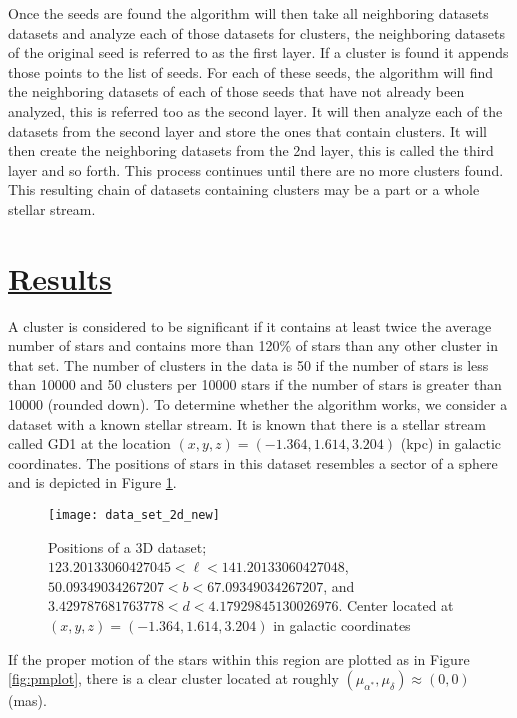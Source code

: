 \documentclass[notitlepage,nofootinbib,preprintnumbers,aps,prd]{revtex4-1}
\begin{document}
\indent Once the seeds are found the algorithm will then take all neighboring datasets datasets and analyze each of those datasets for clusters, the neighboring datasets of the original seed is referred to as the first layer. If a cluster is found it appends those points to the list of seeds. For each of these seeds, the algorithm will find the neighboring datasets of each of those seeds that have not already been analyzed, this is referred too as the second layer. It will then analyze each of the datasets from the second layer and store the ones that contain clusters. It will then create the neighboring datasets from the 2nd layer, this is called the third layer and so forth. This process continues until there are no more clusters found. This resulting chain of datasets containing clusters may be a part or a whole stellar stream.\\





\section{\underline{Results}}
\indent A cluster is considered to be significant if it contains at least twice the average number of stars and contains more than 120\% of stars than any other cluster in that set. The number of clusters in the data is 50 if the number of stars is less than 10000 and 50 clusters per 10000 stars if the number of stars is greater than 10000 (rounded down). To determine whether the algorithm works, we consider a dataset with a known stellar stream. It is known that there is a stellar stream called GD1 at the location $(x,y,z)=(-1.364, 1.614, 3.204)$ (kpc) \cite{streamfinder}
in galactic coordinates. The positions of stars in this dataset resembles a sector of a sphere and is depicted in Figure \ref{fig:3d_data}.
\FloatBarrier
\begin{figure}[h]
\centering
\texttt{[image: data\_set\_2d\_new]}
\caption{Positions of a 3D dataset; $123.20133060427045<\ell<141.20133060427048$, $50.09349034267207<b<67.09349034267207$, and $3.429787681763778<d<4.17929845130026976$. Center located at $(x,y,z)=(-1.364,1.614,3.204)$ in galactic coordinates}
\label{fig:3d_data}
\end{figure}





If the proper motion of the stars within this region are plotted as in Figure \ref{fig:pmplot}, there is a clear cluster located at roughly $(\mu_{\alpha^*},\mu_{\delta}) \approx (0,0)$ (mas).
\end{document}
